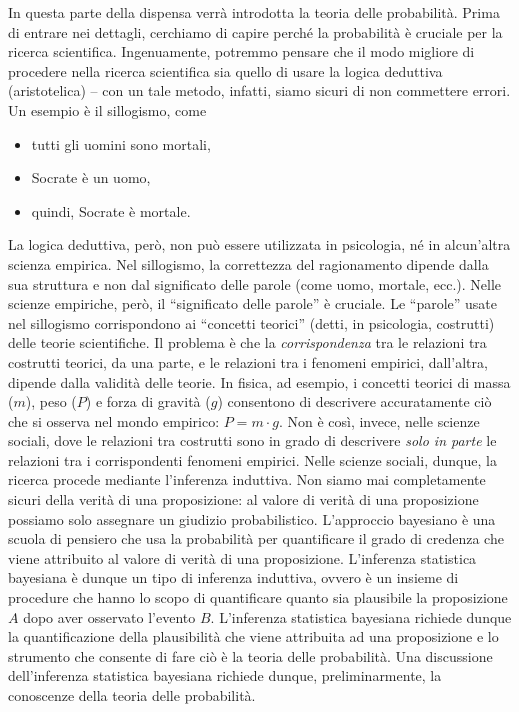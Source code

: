 \documentclass[
  11pt,
]{krantz}
\providecommand{\tightlist}{%
  \setlength{\itemsep}{0pt}\setlength{\parskip}{0pt}}
\theoremstyle{definition}
\theoremstyle{definition}
\theoremstyle{definition}
\theoremstyle{definition}
\theoremstyle{remark}
\begin{document}
In questa parte della dispensa verrà introdotta la teoria delle probabilità. Prima di entrare nei dettagli, cerchiamo di capire perché la probabilità è cruciale per la ricerca scientifica. Ingenuamente, potremmo pensare che il modo migliore di procedere nella ricerca scientifica sia quello di usare la logica deduttiva (aristotelica) -- con un tale metodo, infatti, siamo sicuri di non commettere errori. Un esempio è il sillogismo, come

\begin{itemize}
\tightlist
\item
  tutti gli uomini sono mortali,
\item
  Socrate è un uomo,
\item
  quindi, Socrate è mortale.
\end{itemize}

La logica deduttiva, però, non può essere utilizzata in psicologia, né in alcun'altra scienza empirica. Nel sillogismo, la correttezza del ragionamento dipende dalla sua struttura e non dal significato delle parole (come uomo, mortale, ecc.). Nelle scienze empiriche, però, il ``significato delle parole'' è cruciale. Le ``parole'' usate nel sillogismo corrispondono ai ``concetti teorici'' (detti, in psicologia, costrutti) delle teorie scientifiche. Il problema è che la \emph{corrispondenza} tra le relazioni tra costrutti teorici, da una parte, e le relazioni tra i fenomeni empirici, dall'altra, dipende dalla validità delle teorie. In fisica, ad esempio, i concetti teorici di massa (\(m\)), peso (\(P\)) e forza di gravità (\(g\)) consentono di descrivere accuratamente ciò che si osserva nel mondo empirico: \(P = m \cdot g\). Non è così, invece, nelle scienze sociali, dove le relazioni tra costrutti sono in grado di descrivere \emph{solo in parte} le relazioni tra i corrispondenti fenomeni empirici. Nelle scienze sociali, dunque, la ricerca procede mediante l'inferenza induttiva. Non siamo mai completamente sicuri della verità di una proposizione: al valore di verità di una proposizione possiamo solo assegnare un giudizio probabilistico. L'approccio bayesiano è una scuola di pensiero che usa la probabilità per quantificare il grado di credenza che viene attribuito al valore di verità di una proposizione. L'inferenza statistica bayesiana è dunque un tipo di inferenza induttiva, ovvero è un insieme di procedure che hanno lo scopo di quantificare quanto sia plausibile la proposizione \(A\) dopo aver osservato l'evento \(B\). L'inferenza statistica bayesiana richiede dunque la quantificazione della plausibilità che viene attribuita ad una proposizione e lo strumento che consente di fare ciò è la teoria delle probabilità. Una discussione dell'inferenza statistica bayesiana richiede dunque, preliminarmente, la conoscenze della teoria delle probabilità.
\end{document}
